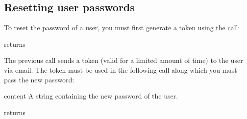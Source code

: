 \subsection{Resetting user passwords}

To reset the password of a user, you must first generate a token using the call:

\begin{apidata}{returns}
  \begin{datalist}
  \end{datalist}
\end{apidata}

The previous call sends a token (valid for a limited amount of time) to the user
via email. The token must be used in the following call along which you must
pass the new password:

\begin{apidata}{content}
  A string containing the new password of the user.
\end{apidata}
\begin{apidata}{returns}
  \begin{datalist}
  \end{datalist}
\end{apidata}



